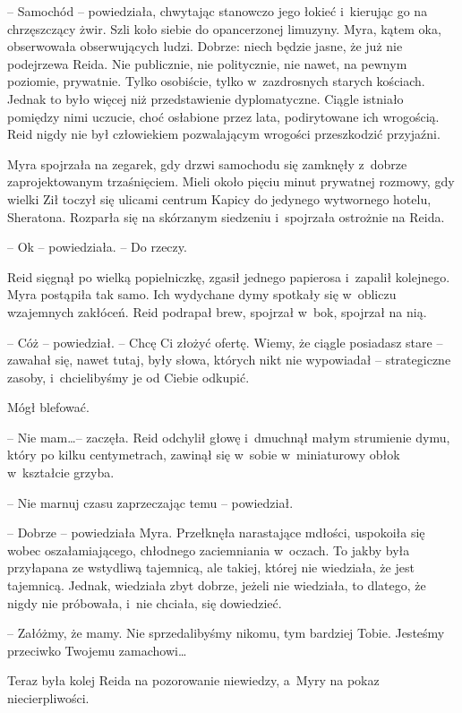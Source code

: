 \documentclass[oneside,polish,11pt,sfheadings]{mwbk}
\begin{document}
-- Samochód -- powiedziała, chwytając stanowczo jego łokieć i~kierując go
na chrzęszczący żwir. Szli koło siebie do opancerzonej limuzyny. Myra,
kątem oka, obserwowała obserwujących ludzi. Dobrze: niech będzie jasne,
że już nie podejrzewa Reida. Nie publicznie, nie politycznie, nie nawet,
na pewnym poziomie, prywatnie. Tylko osobiście, tylko w~zazdrosnych
starych kościach. Jednak to było więcej niż przedstawienie
dyplomatyczne. Ciągle istniało pomiędzy nimi uczucie, choć osłabione
przez lata, podirytowane ich wrogością. Reid nigdy nie był człowiekiem
pozwalającym wrogości przeszkodzić przyjaźni.

Myra spojrzała na zegarek, gdy drzwi samochodu się zamknęły z~dobrze
zaprojektowanym trzaśnięciem. Mieli około pięciu minut prywatnej
rozmowy, gdy wielki Ził toczył się ulicami centrum Kapicy do jedynego
wytwornego hotelu, Sheratona. Rozparła się na skórzanym siedzeniu i~spojrzała ostrożnie na Reida.

-- Ok -- powiedziała. -- Do rzeczy.

Reid sięgnął po wielką popielniczkę, zgasił jednego papierosa i~zapalił
kolejnego. Myra postąpiła tak samo. Ich wydychane dymy spotkały się w~obliczu wzajemnych zakłóceń. Reid podrapał brew, spojrzał w~bok,
spojrzał na nią.

-- Cóż -- powiedział. -- Chcę Ci złożyć ofertę. Wiemy, że ciągle posiadasz
stare -- zawahał się, nawet tutaj, były słowa, których nikt nie
wypowiadał -- strategiczne zasoby, i~chcielibyśmy je od Ciebie odkupić.

Mógł blefować.

-- Nie mam\ldots -- zaczęła. Reid odchylił głowę i~dmuchnął małym strumienie
dymu, który po kilku centymetrach, zawinął się w~sobie w~miniaturowy
obłok w~kształcie grzyba.

-- Nie marnuj czasu zaprzeczając temu -- powiedział.

-- Dobrze -- powiedziała Myra. Przełknęła narastające mdłości, uspokoiła
się wobec oszałamiającego, chłodnego zaciemniania w~oczach. To jakby
była przyłapana ze wstydliwą tajemnicą, ale takiej, której nie
wiedziała, że jest tajemnicą. Jednak, wiedziała zbyt dobrze, jeżeli nie
wiedziała, to dlatego, że nigdy nie próbowała, i~nie chciała, się
dowiedzieć.

-- Załóżmy, że mamy. Nie sprzedalibyśmy nikomu, tym bardziej Tobie.
Jesteśmy przeciwko Twojemu zamachowi\ldots

Teraz była kolej Reida na pozorowanie niewiedzy, a~Myry na pokaz
niecierpliwości.
\end{document}
